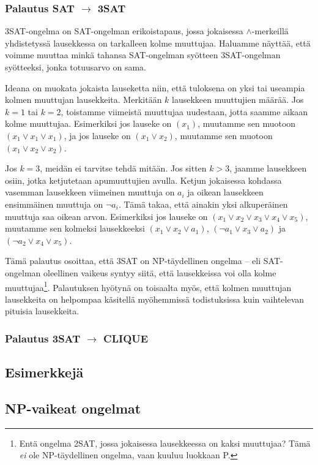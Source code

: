 \subsubsection{Palautus SAT $\rightarrow$ 3SAT}

3SAT-ongelma on SAT-ongelman erikoistapaus, jossa jokaisessa
$\land$-merkeillä yhdistetyssä lausekkessa on tarkalleen kolme muuttujaa.
Haluamme näyttää, että voimme muuttaa minkä tahansa
SAT-ongelman syötteen 3SAT-ongelman syötteeksi,
jonka totuusarvo on sama.

Ideana on muokata jokaista lauseketta niin, 
että tuloksena on yksi tai useampia kolmen muuttujan lausekkeita.
Merkitään $k$ lausekkeen muuttujien määrää.
Jos $k=1$ tai $k=2$, toistamme viimeistä muuttujaa uudestaan,
jotta saamme aikaan kolme muuttujaa.
Esimerkiksi jos lauseke on $(x_1)$, muutamme sen muotoon
$(x_1 \lor x_1 \lor x_1)$, ja jos lauseke on $(x_1 \lor x_2)$, muutamme
sen muotoon $(x_1 \lor x_2 \lor x_2)$.

Jos $k=3$, meidän ei tarvitse tehdä mitään. Jos sitten $k>3$,
jaamme lausekkeen osiin, jotka ketjutetaan apumuuttujien avulla.
Ketjun jokaisessa kohdassa vasemman lausekkeen viimeinen
muuttuja on $a_i$ ja oikean lausekkeen ensimmäinen muuttuja on $\neg a_i$.
Tämä takaa, että ainakin yksi alkuperäinen muuttuja saa oikean arvon.
Esimerkiksi jos lauseke on $(x_1 \lor x_2 \lor x_3 \lor x_4 \lor x_5)$,
muutamme sen kolmeksi lausekkeeksi $(x_1 \lor x_2 \lor a_1)$,
$(\neg a_1 \lor x_3 \lor a_2)$ ja $(\neg a_2 \lor x_4 \lor x_5)$.

Tämä palautus osoittaa, että 3SAT on NP-täydellinen ongelma --
eli SAT-ongelman oleellinen vaikeus syntyy siitä, että lausekkeissa
voi olla kolme muuttujaa\footnote{Entä ongelma 2SAT, jossa jokaisessa lausekkeessa
on kaksi muuttujaa? Tämä \emph{ei} ole NP-täydellinen ongelma,
vaan kuuluu luokkaan P.}.
Palautuksen hyötynä on toisaalta myös, että kolmen muuttujan lausekkeita
on helpompaa käsitellä myöhemmissä todistuksissa
kuin vaihtelevan pituisia lausekkeita.


\subsubsection{Palautus 3SAT $\rightarrow$ CLIQUE}

\subsection{Esimerkkejä}

\subsection{NP-vaikeat ongelmat}


